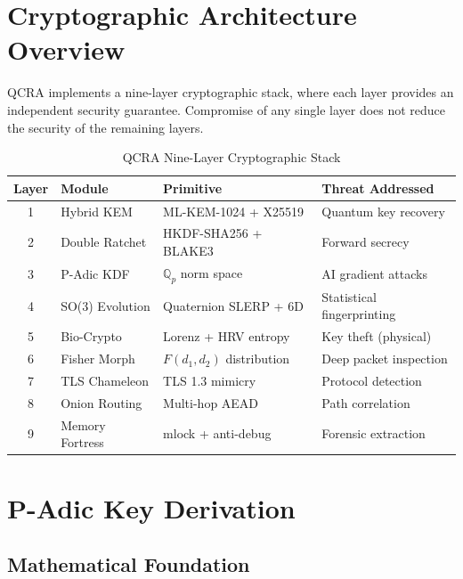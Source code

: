 \documentclass[11pt,a4paper]{article}
\begin{document}
\section{Cryptographic Architecture Overview}
\label{sec:architecture}

QCRA implements a nine-layer cryptographic stack, where each layer provides
an independent security guarantee. Compromise of any single layer does not
reduce the security of the remaining layers.

\begin{table}[h]
\centering
\caption{QCRA Nine-Layer Cryptographic Stack}
\label{tab:layers}
\begin{tabular}{@{}clll@{}}
\toprule
\textbf{Layer} & \textbf{Module} & \textbf{Primitive} & \textbf{Threat Addressed} \\
\midrule
1 & Hybrid KEM    & ML-KEM-1024 + X25519      & Quantum key recovery \\
2 & Double Ratchet & HKDF-SHA256 + BLAKE3      & Forward secrecy \\
3 & P-Adic KDF    & $\mathbb{Q}_p$ norm space  & AI gradient attacks \\
4 & SO(3) Evolution & Quaternion SLERP + 6D    & Statistical fingerprinting \\
5 & Bio-Crypto    & Lorenz + HRV entropy       & Key theft (physical) \\
6 & Fisher Morph  & $F(d_1,d_2)$ distribution  & Deep packet inspection \\
7 & TLS Chameleon & TLS 1.3 mimicry            & Protocol detection \\
8 & Onion Routing & Multi-hop AEAD             & Path correlation \\
9 & Memory Fortress & mlock + anti-debug       & Forensic extraction \\
\bottomrule
\end{tabular}
\end{table}

\section{P-Adic Key Derivation}
\label{sec:padic}

\subsection{Mathematical Foundation}
\end{document}
